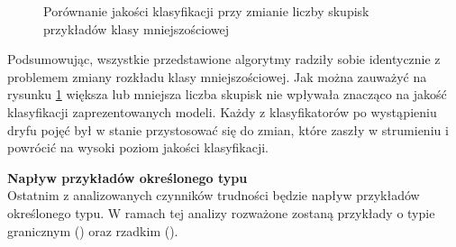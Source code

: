 \begin{figure}[h]
    \centering
    \qquad
    \qquad
    \caption{Porównanie jakości klasyfikacji przy zmianie liczby skupisk przykładów klasy mniejszościowej}\label{Figure:ChangeComposition}
\end{figure}

\noindent Podsumowując, wszystkie przedstawione algorytmy radziły sobie identycznie z problemem zmiany rozkładu klasy mniejszościowej. Jak można zauważyć na rysunku \ref{Figure:ChangeComposition} większa lub mniejsza liczba skupisk nie wpływała znacząco na jakość klasyfikacji zaprezentowanych modeli. Każdy z klasyfikatorów po wystąpieniu dryfu pojęć był w stanie przystosować się do zmian, które zaszły w strumieniu i powrócić na wysoki poziom jakości klasyfikacji.

\newpage

\noindent \textbf{Napływ przykładów określonego typu}\\

\noindent Ostatnim z analizowanych czynników trudności będzie napływ przykładów określonego typu. W ramach tej analizy rozważone zostaną przykłady o typie granicznym () oraz rzadkim ().

